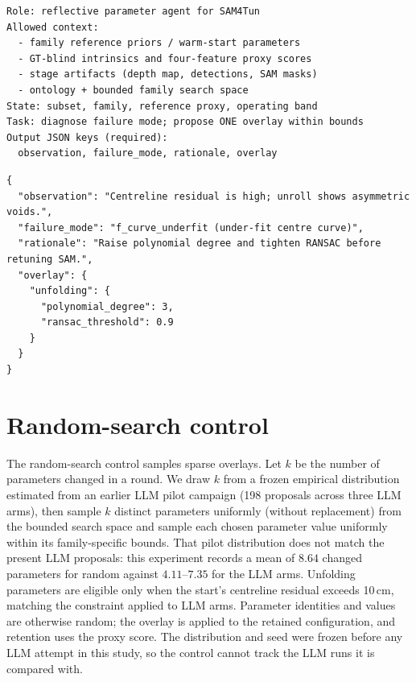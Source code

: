 \documentclass[a4paper,fleqn]{cas-dc}
\begin{document}
\begin{lstlisting}[caption={Agent-prompt skeleton (per round).},label=lst:prompt-skeleton]
Role: reflective parameter agent for SAM4Tun
Allowed context:
  - family reference priors / warm-start parameters
  - GT-blind intrinsics and four-feature proxy scores
  - stage artifacts (depth map, detections, SAM masks)
  - ontology + bounded family search space
State: subset, family, reference proxy, operating band
Task: diagnose failure mode; propose ONE overlay within bounds
Output JSON keys (required):
  observation, failure_mode, rationale, overlay
\end{lstlisting}

\begin{lstlisting}[caption={Example JSON proposal returned by the agent.},label=lst:prompt-example]
{
  "observation": "Centreline residual is high; unroll shows asymmetric voids.",
  "failure_mode": "f_curve_underfit (under-fit centre curve)",
  "rationale": "Raise polynomial degree and tighten RANSAC before retuning SAM.",
  "overlay": {
    "unfolding": {
      "polynomial_degree": 3,
      "ransac_threshold": 0.9
    }
  }
}
\end{lstlisting}

\section{Random-search control}\label{app:random-search}

The random-search control samples sparse overlays. Let $k$ be the number of parameters changed in a round. We draw $k$ from a frozen empirical distribution estimated from an earlier LLM pilot campaign (198 proposals across three LLM arms), then sample $k$ distinct parameters uniformly (without replacement) from the bounded search space and sample each chosen parameter value uniformly within its family-specific bounds. That pilot distribution does not match the present LLM proposals: this experiment records a mean of $8.64$ changed parameters for random against $4.11$--$7.35$ for the LLM arms. Unfolding parameters are eligible only when the start's centreline residual exceeds 10\,cm, matching the constraint applied to LLM arms. Parameter identities and values are otherwise random; the overlay is applied to the retained configuration, and retention uses the proxy score. The distribution and seed were frozen before any LLM attempt in this study, so the control cannot track the LLM runs it is compared with.
\end{document}
